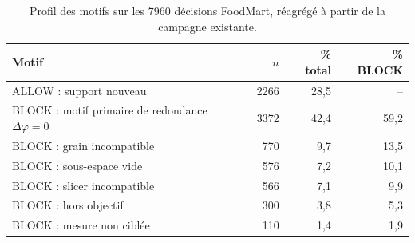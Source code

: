 \begin{table}[!tb]
\centering
\caption{Profil des motifs sur les 7960 décisions FoodMart, réagrégé à partir de la campagne existante.}
\label{tab:campaign-a-reasons}
\scriptsize
\setlength{\tabcolsep}{2.0pt}
\renewcommand{\arraystretch}{1.07}
\begin{tabular}{@{}p{4.0cm}rrr@{}}
\toprule
Motif & $n$ & \% total & \% BLOCK \\
\midrule
ALLOW : support nouveau & 2266 & 28,5 & -- \\
BLOCK : motif primaire de redondance $\Delta\varphi=0$ & 3372 & 42,4 & 59,2 \\
BLOCK : grain incompatible & 770 & 9,7 & 13,5 \\
BLOCK : sous-espace vide & 576 & 7,2 & 10,1 \\
BLOCK : slicer incompatible & 566 & 7,1 & 9,9 \\
BLOCK : hors objectif & 300 & 3,8 & 5,3 \\
BLOCK : mesure non ciblée & 110 & 1,4 & 1,9 \\
\bottomrule
\end{tabular}
\normalsize
\end{table}
